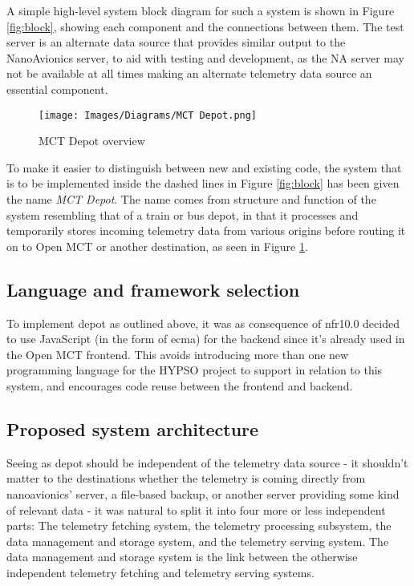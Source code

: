 A simple high-level system block diagram for such a system is shown in Figure \ref{fig:block}, showing each component and the connections between them. The test server is an alternate data source that provides similar output to the NanoAvionics server, to aid with testing and development, as the NA server may not be available at all times making an alternate telemetry data source an essential component.

\begin{figure}[H]
  \centering
  \texttt{[image: Images/Diagrams/MCT Depot.png]}
  \caption{MCT Depot overview}
  \label{fig:mctdepot}
\end{figure}

To make it easier to distinguish between new and existing code, the system that is to be implemented inside the dashed lines in Figure \ref{fig:block} has been given the name \emph{MCT Depot}. The name comes from structure and function of the system resembling that of a train or bus depot, in that it processes and temporarily stores incoming telemetry data from various origins before routing it on to Open MCT or another destination, as seen in Figure \ref{fig:mctdepot}.

\subsection{Language and framework selection}
To implement \Gls{depot} as outlined above, it was as consequence of \acrshort{nfr}10.0 decided to use JavaScript (in the form of \Gls{ecma}) for the \gls{backend} since it’s already used in the Open MCT \gls{frontend}. This avoids introducing more than one new programming language for the HYPSO project to support in relation to this system, and encourages code reuse between the \gls{frontend} and \gls{backend}.

\subsection{Proposed system architecture}
Seeing as \Gls{depot} should be independent of the telemetry data source - it shouldn't matter to the destinations whether the telemetry is coming directly from \Gls{nanoavionics}’ server, a file-based backup, or another server providing some kind of relevant data - it was natural to split it into four more or less independent parts: The telemetry fetching system, the telemetry processing subsystem, the data management and storage system, and the telemetry serving system. The data management and storage system is the link between the otherwise independent telemetry fetching and telemetry serving systems.

